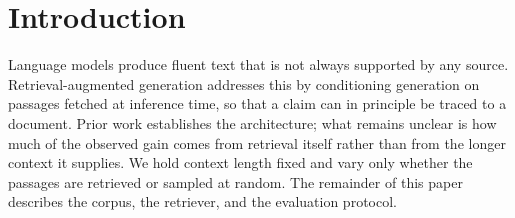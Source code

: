 \documentclass{article}
\begin{document}
\begin{abstract}
Retrieval-augmented generation grounds a language model in retrieved evidence.
We report a system that retrieves passages from a domain corpus and conditions
generation on them, and we find that it reduces unsupported claims relative to
an unretrieved baseline. Our evaluation uses a single held-out set of 400
questions and reports exact-match accuracy only.
\end{abstract}

\section{Introduction}
Language models produce fluent text that is not always supported by any source.
Retrieval-augmented generation addresses this by conditioning generation on
passages fetched at inference time, so that a claim can in principle be traced
to a document. Prior work establishes the architecture; what remains unclear is
how much of the observed gain comes from retrieval itself rather than from the
longer context it supplies. We hold context length fixed and vary only whether
the passages are retrieved or sampled at random. The remainder of this paper
describes the corpus, the retriever, and the evaluation protocol.
\end{document}
